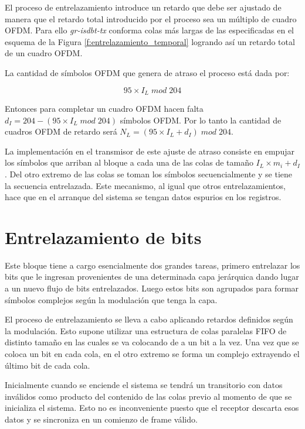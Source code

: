 El proceso de entrelazamiento introduce un retardo que debe ser ajustado de manera que el retardo total introducido por el proceso sea un m\'ultiplo de cuadro OFDM. Para ello \textit{gr-isdbt-tx} conforma colas m\'as largas de las especificadas en el esquema de la Figura \ref{f:entrelazamiento_temporal} logrando as\'i un retardo total de un cuadro OFDM.

La cantidad de s\'imbolos OFDM que genera de atraso el proceso est\'a dada por:

\begin{equation}
95 \times I_L \; mod \; 204
\end{equation}

Entonces para completar un cuadro OFDM hacen falta $d_I = 204 - (95 \times I_L \; mod \; 204)$ s\'imbolos OFDM. Por lo tanto la cantidad de cuadros OFDM de retardo ser\'a $N_L = (95 \times I_L +d_I) \; mod \; 204$.

La implementaci\'on en el transmisor de este ajuste de atraso consiste en empujar los s\'imbolos que arriban al bloque a cada una de las colas de tamaño $I_L \times m_i + d_I$. Del otro extremo de las colas se toman los s\'imbolos secuencialmente y se tiene la secuencia entrelazada. Este mecanismo, al igual que otros entrelazamientos, hace que en el arranque del sistema se tengan datos espurios en los registros. 

\section{Entrelazamiento de bits}

Este bloque tiene a cargo esencialmente dos grandes tareas, primero entrelazar los bits que le ingresan provenientes de una determinada capa jerárquica dando lugar a un nuevo flujo de bits entrelazados. Luego estos bits son agrupados para formar símbolos complejos según la modulación que tenga la capa.

El proceso de entrelazamiento se lleva a cabo aplicando retardos definidos según la modulación. Esto supone utilizar una estructura de colas paralelas FIFO de distinto tamaño en las cuales se va colocando de a un bit a la vez. Una vez que se coloca un bit en cada cola, en el otro extremo se forma un complejo extrayendo el último bit de cada cola.

Inicialmente cuando se enciende el sistema se tendrá un transitorio con datos inválidos como producto del contenido de las colas previo al momento de que se inicializa el sistema. Esto no es inconveniente puesto que el receptor descarta esos datos y se sincroniza en un comienzo de frame válido.

